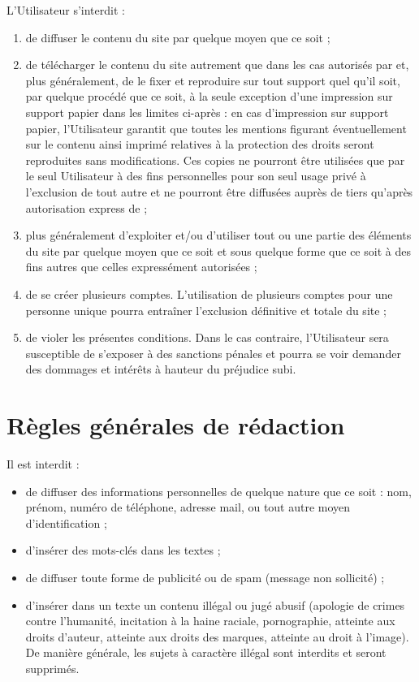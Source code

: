 L'Utilisateur s'interdit :
\begin{enumerate}
   \item de diffuser le contenu du site par quelque moyen que ce soit ;
   \item de télécharger le contenu du site autrement que dans les cas autorisés par \eDevoir et, plus généralement, de le fixer et reproduire sur tout support quel qu'il soit, par quelque procédé que ce soit, à la seule exception d'une impression sur support papier dans les limites ci-après : en cas d'impression sur support papier, l'Utilisateur garantit que toutes les mentions figurant éventuellement sur le contenu ainsi imprimé relatives à la protection des droits seront reproduites sans modifications. Ces copies ne pourront être utilisées que par le seul Utilisateur à des fins personnelles pour son seul usage privé à l'exclusion de tout autre et ne pourront être diffusées auprès de tiers qu'après autorisation express	 de \eDevoir ;
   \item plus généralement d'exploiter et/ou d'utiliser tout ou une partie des éléments du site par quelque moyen que ce soit et sous quelque forme que ce soit à des fins autres que celles expressément autorisées ;
   \item de se créer plusieurs comptes. L'utilisation de plusieurs comptes pour une personne unique pourra entraîner l'exclusion définitive et totale du site ;
   \item de violer les présentes conditions. Dans le cas contraire, l'Utilisateur sera susceptible de s'exposer à des sanctions pénales et pourra se voir demander des dommages et intérêts à hauteur du préjudice subi.
\end{enumerate}


\section{Règles générales de rédaction}

Il est interdit :
\begin{itemize}
  \item de diffuser des informations personnelles de quelque nature que ce soit : nom, prénom, numéro de téléphone, adresse mail, ou tout autre moyen d'identification ;
  \item d'insérer des mots-clés dans les textes ;
  \item de diffuser toute forme de publicité ou de spam (message non sollicité) ;
  \item d'insérer dans un texte un contenu illégal ou jugé abusif (apologie de crimes contre l'humanité, incitation à la haine raciale, pornographie, atteinte aux droits d'auteur, atteinte aux droits des marques, atteinte au droit à l'image). De manière générale, les sujets à caractère illégal sont interdits et seront supprimés.
\end{itemize}

